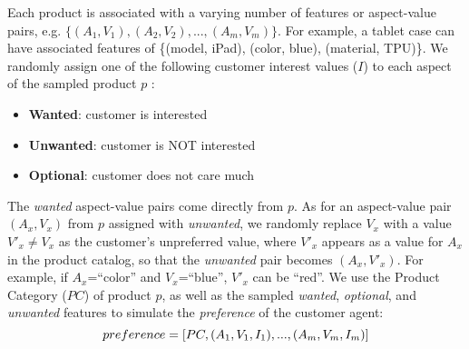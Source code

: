 Each product is associated with a varying number of features or aspect-value pairs, e.g. $\{(A_1, V_1), (A_2, V_2), ..., (A_m, V_m)\}$. %
For example, a tablet case can have associated features of \{(model, iPad), (color, blue), (material, TPU)\}. 
We randomly assign one of the following customer interest values ($I$) to each aspect of the sampled product $p$ :
\vspace{-1em}
\begin{itemize}
\setlength\itemsep{-0.5em}
    \item \textbf{Wanted}: customer is interested
    \item \textbf{Unwanted}: customer is NOT interested
    \item \textbf{Optional}: customer does not care much
\end{itemize}
\vspace{-1em}

The \textit{wanted} aspect-value pairs come directly from $p$. As for an aspect-value pair $(A_x,V_x)$ from $p$ assigned with \textit{unwanted}, we randomly replace $V_x$ with a value $V'_x \ne V_x$ as the customer's unpreferred value, where $V'_x$ appears as a value for $A_x$ in the product catalog, so that the \textit{unwanted} pair becomes $(A_x,V'_x)$. %
For example, if $A_x$=``color'' and $V_x$=``blue'', $V'_x$ can be ``red''. 
We use the Product Category ($PC$) of product $p$, as well as the sampled \textit{wanted}, \textit{optional}, and \textit{unwanted} features to simulate the \textit{preference} of the customer agent: %
\vspace{-0.8em}
\begin{equation}
\small
    preference = [PC, (A_1,V_1,I_1), ..., (A_m,V_m,I_m)]
\vspace{-1em}
\end{equation}

